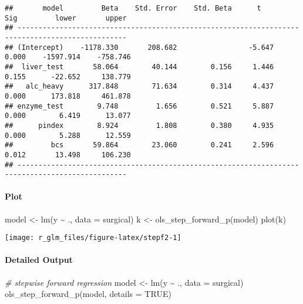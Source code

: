 \documentclass[
]{article}
\newenvironment{Shaded}{\begin{snugshade}}{\end{snugshade}}
\newcommand{\AttributeTok}[1]{\textcolor[rgb]{0.77,0.63,0.00}{#1}}
\newcommand{\CommentTok}[1]{\textcolor[rgb]{0.56,0.35,0.01}{\textit{#1}}}
\newcommand{\ConstantTok}[1]{\textcolor[rgb]{0.00,0.00,0.00}{#1}}
\newcommand{\FunctionTok}[1]{\textcolor[rgb]{0.00,0.00,0.00}{#1}}
\newcommand{\NormalTok}[1]{#1}
\newcommand{\OtherTok}[1]{\textcolor[rgb]{0.56,0.35,0.01}{#1}}
\newcommand{\SpecialCharTok}[1]{\textcolor[rgb]{0.00,0.00,0.00}{#1}}
\begin{document}
\begin{verbatim}
##       model         Beta    Std. Error    Std. Beta      t        Sig         lower       upper 
## ------------------------------------------------------------------------------------------------
## (Intercept)    -1178.330       208.682                 -5.647    0.000    -1597.914    -758.746 
##  liver_test       58.064        40.144        0.156     1.446    0.155      -22.652     138.779 
##   alc_heavy      317.848        71.634        0.314     4.437    0.000      173.818     461.878 
## enzyme_test        9.748         1.656        0.521     5.887    0.000        6.419      13.077 
##      pindex        8.924         1.808        0.380     4.935    0.000        5.288      12.559 
##         bcs       59.864        23.060        0.241     2.596    0.012       13.498     106.230 
## ------------------------------------------------------------------------------------------------
\end{verbatim}

\hypertarget{plot-2}{%
\paragraph{Plot}\label{plot-2}}

\begin{Shaded}
\begin{Highlighting}[]
\NormalTok{model }\OtherTok{\textless{}{-}} \FunctionTok{lm}\NormalTok{(y }\SpecialCharTok{\textasciitilde{}}\NormalTok{ ., }\AttributeTok{data =}\NormalTok{ surgical)}
\NormalTok{k }\OtherTok{\textless{}{-}} \FunctionTok{ols\_step\_forward\_p}\NormalTok{(model)}
\FunctionTok{plot}\NormalTok{(k)}
\end{Highlighting}
\end{Shaded}

\begin{center}\texttt{[image: r\_glm\_files/figure-latex/stepf2-1]} \end{center}

\hypertarget{detailed-output}{%
\paragraph{Detailed Output}\label{detailed-output}}

\begin{Shaded}
\begin{Highlighting}[]
\CommentTok{\# stepwise forward regression}
\NormalTok{model }\OtherTok{\textless{}{-}} \FunctionTok{lm}\NormalTok{(y }\SpecialCharTok{\textasciitilde{}}\NormalTok{ ., }\AttributeTok{data =}\NormalTok{ surgical)}
\FunctionTok{ols\_step\_forward\_p}\NormalTok{(model, }\AttributeTok{details =} \ConstantTok{TRUE}\NormalTok{)}
\end{Highlighting}
\end{Shaded}
\end{document}
